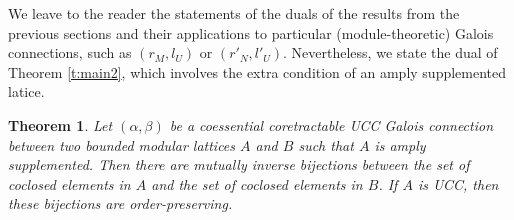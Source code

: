 \documentclass[11pt,a4paper]{amsart}
\newtheorem{thm}[theorem]{Theorem}
\begin{document}
We leave to the reader the statements of the duals of the results from the previous sections and their applications to
particular (module-theoretic) Galois connections, such as $(r_M,l_U)$ or $(r'_N,l'_U)$. Nevertheless, we state the dual
of Theorem \ref{t:main2}, which involves the extra condition of an amply supplemented latice. 

\begin{thm} \label{t:hmain2} Let $(\alpha,\beta)$ be a coessential coretractable UCC Galois connection between two
bounded modular lattices $A$ and $B$ such that $A$ is amply supplemented. Then there are mutually inverse bijections
between the set of coclosed elements in $A$ and the set of coclosed elements in $B$. If $A$ is UCC, then these
bijections are order-preserving.
\end{thm}
\end{document}
